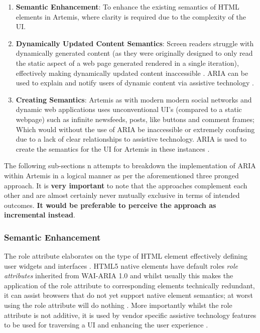 \begin{enumerate}
    
    \item \textbf{Semantic Enhancement}: To enhance the existing semantics of HTML elements in Artemis, where clarity is required due to the complexity of the UI.
    
    \item \textbf{Dynamically Updated Content Semantics}: Screen readers struggle with dynamically generated content (as they were originally designed to only read the static aspect of a web page generated rendered in a single iteration), effectively making dynamically updated content inaccessible \cite{Sukardi2016,Mills,MozillaDeveloperNetwork}. ARIA can be used to explain and notify users of dynamic content via assistive technology \cite{Sukardi2016,MozillaDeveloperNetwork}.
    
    \item \textbf{Creating Semantics}: Artemis as with modern modern social networks and dynamic web applications uses unconventional UI's (compared to a static webpage) such as infinite newsfeeds, posts, like buttons and comment frames; Which would without the use of ARIA be inaccessible or extremely confusing due to a lack of clear relationships \cite{MozillaDeveloperNetwork,W3Ca,MozillaDeveloperNetworkb} to assistive technology. ARIA is used to create the semantics for the UI for Artemis in these instances .

\end{enumerate}

The following sub-section\textquotesingle s n attempts to breakdown the implementation of ARIA within Artemis in a logical manner as per the aforementioned three pronged approach. It is \textbf{very important} to note that the approaches complement each other and are almost certainly never mutually exclusive in terms of intended outcomes. \textbf{It would be preferable to perceive the approach as incremental instead}.

\subsubsection{Semantic Enhancement}

The role attribute elaborates on the type of HTML element \cite{MDN} effectively defining user widgets and interfaces \cite{W3C2014a}. HTML5 native elements have default roles \textit{role attributes} inherited from WAI-ARIA 1.0 and whilst usually this makes the application of the role attribute to corresponding elements technically redundant, it can assist browsers that do not yet support native element semantics; at worst using the role attribute will do nothing \cite{W3C2014,CraigJamesH}.  More importantly whilst the role attribute is not additive, it is used by vendor specific assistive technology features to be used for traversing a UI and enhancing the user experience \cite{W3C2014a,MozillaDeveloperNetworkc}.

